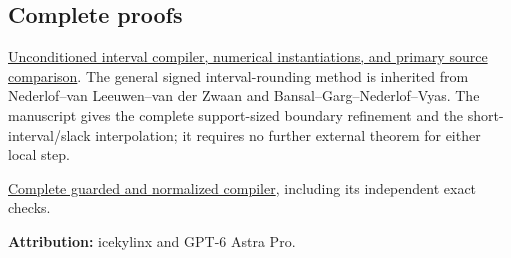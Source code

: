 \hypertarget{af-c97649ed9d-complete-proofs}{%
\subsection{Complete proofs}\label{af-c97649ed9d-complete-proofs}}

\href{https://github.com/icekylinx/algorithm-frontier/blob/main/problems/boolean-linear-compiler/manuscripts/boolean-linear-optimization-compiler.md}{Unconditioned interval compiler, numerical instantiations, and primary source comparison}. The general signed interval-rounding method is inherited from Nederlof--van Leeuwen--van der Zwaan and Bansal--Garg--Nederlof--Vyas. The manuscript gives the complete support-sized boundary refinement and the short-interval/slack interpolation; it requires no further external theorem for either local step.

\href{https://github.com/icekylinx/algorithm-frontier/blob/main/problems/boolean-linear-compiler/manuscripts/cardinality-and-modal-interval-compilation.md}{Complete guarded and normalized compiler}, including its independent exact checks.

\textbf{Attribution:} icekylinx and GPT-6 Astra Pro.
